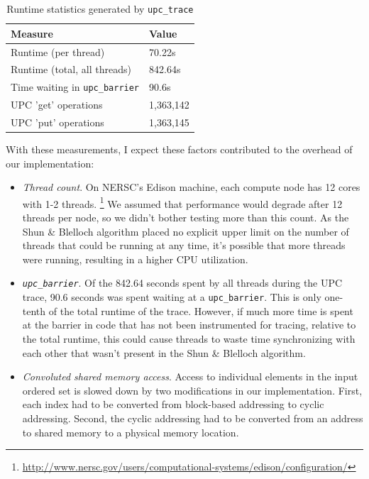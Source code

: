 \documentclass[10pt]{article}
\begin{document}
\begin{table}[t]
\caption{Runtime statistics generated by \texttt{upc\_trace}}
\vspace{1.5ex}
\label{tab:trace_measurements}
\centering
\begin{tabular}{ll}
\toprule
\textbf{Measure} & \textbf{Value} \\
\midrule
Runtime (per thread) & 70.22s \\ \midrule
Runtime (total, all threads) & 842.64s \\ \midrule
Time waiting in \texttt{upc\_barrier} & 90.6s \\ \midrule
UPC 'get' operations & 1,363,142 \\ \midrule
UPC 'put' operations & 1,363,145 \\ \midrule
\end{tabular}
\end{table}

With these measurements, I expect these factors contributed to the overhead of our
implementation:
\begin{itemize}
  \item \emph{Thread count}.
        On NERSC's Edison machine, each compute node has 12 cores with 1-2 threads.
        \footnote{\url{http://www.nersc.gov/users/computational-systems/edison/configuration/}}
        We assumed that performance would degrade after 12 threads per node, so we didn't
        bother testing more than this count.
        As the Shun \& Blelloch algorithm placed no explicit upper limit on the number of threads
        that could be running at any time, it's possible that more threads were running, resulting
        in a higher CPU utilization.
  \item \emph{\texttt{upc\_barrier}}.
        Of the 842.64 seconds spent by all threads during the UPC trace, 90.6 seconds was
        spent waiting at a \texttt{upc\_barrier}.
        This is only one-tenth of the total runtime of the trace.
        However, if much more time is spent at the barrier in code that has not been instrumented
        for tracing, relative to the total runtime, this could cause threads to waste time
        synchronizing with each other that wasn't present in the Shun \& Blelloch algorithm.
  \item \emph{Convoluted shared memory access}.
        Access to individual elements in the input ordered set is slowed down by two modifications
        in our implementation.
        First, each index had to be converted from block-based addressing to cyclic addressing.
        Second, the cyclic addressing had to be converted from an address to shared memory to a
        physical memory location.
\end{itemize}
\end{document}
